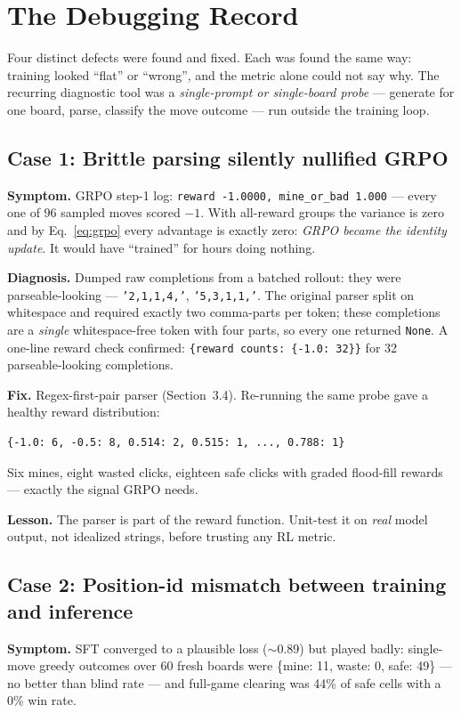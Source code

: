 \documentclass[11pt]{article}
\begin{document}
\section{The Debugging Record}
\label{sec:bugs}
Four distinct defects were found and fixed. Each was found the same way:
training looked ``flat'' or ``wrong'', and the metric alone could not say
why. The recurring diagnostic tool was a \emph{single-prompt or single-board
probe} --- generate for one board, parse, classify the move outcome --- run
outside the training loop.

\subsection{Case 1: Brittle parsing silently nullified GRPO}
\label{sec:bug-parse}
\textbf{Symptom.} GRPO step-1 log: \texttt{reward -1.0000, mine\_or\_bad
1.000} --- every one of 96 sampled moves scored $-1$. With all-reward groups
the variance is zero and by Eq.~\eqref{eq:grpo} every advantage is exactly
zero: \emph{GRPO became the identity update}. It would have ``trained'' for
hours doing nothing.

\textbf{Diagnosis.} Dumped raw completions from a batched rollout: they were
parseable-looking --- \texttt{'2,1,1,4,'}, \texttt{'5,3,1,1,'}. The original
parser split on whitespace and required exactly two comma-parts per token;
these completions are a \emph{single} whitespace-free token with four parts,
so every one returned \texttt{None}. A one-line reward check confirmed:
\texttt{\{reward counts: \{-1.0: 32\}\}} for 32 parseable-looking
completions.

\textbf{Fix.} Regex-first-pair parser (Section~3.4). Re-running the same
probe gave a healthy reward distribution:
\begin{lstlisting}[language={}, caption={Reward histogram after the parser fix (32 rollouts).}]
{-1.0: 6, -0.5: 8, 0.514: 2, 0.515: 1, ..., 0.788: 1}
\end{lstlisting}
Six mines, eight wasted clicks, eighteen safe clicks with graded flood-fill
rewards --- exactly the signal GRPO needs.

\textbf{Lesson.} The parser is part of the reward function. Unit-test it on
\emph{real} model output, not idealized strings, before trusting any RL
metric.

\subsection{Case 2: Position-id mismatch between training and inference}
\label{sec:bug-pos}
\textbf{Symptom.} SFT converged to a plausible loss ($\sim$0.89) but played
badly: single-move greedy outcomes over 60 fresh boards were
\{mine: 11, waste: 0, safe: 49\} --- no better than blind rate --- and
full-game clearing was 44\% of safe cells with a 0\% win rate.
\end{document}
